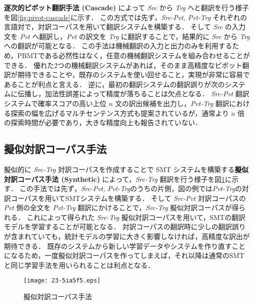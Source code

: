 \documentclass[japanese]{jnlp_1.4}
\begin{document}
\textbf{逐次的ピボット翻訳手法 (Cascade)} \cite{gispert06}によって \textit{Src} から \textit{Trg} へと翻訳を行う様子を図\ref{fig:pivot-cascade}に示す．
この方式では先ず，\textit{Src-Pvt, Pvt-Trg} それぞれの言語対で，対訳コーパスを用いて翻訳システムを構築する．
そして \textit{Src} の入力文を \textit{Pvt} へ翻訳し，\textit{Pvt} の訳文を \textit{Trg} に翻訳することで，結果的に \textit{Src} から \textit{Trg} への翻訳が可能となる．
この手法は機械翻訳の入力と出力のみを利用するため，PBMTである必然性はなく，任意の機械翻訳システムを組み合わせることができる．
優れた2つの機械翻訳システムがあれば，そのまま高精度なピボット翻訳が期待できることや，既存のシステムを使い回せること，実現が非常に容易であることが利点と言える．
逆に，最初の翻訳システムの翻訳誤りが次のシステムに伝播し，加法性誤差によって精度が落ちることは欠点となる．
\textit{Src-Pvt} 翻訳システムで確率スコアの高い上位 $n$ 文の訳出候補を出力し，\textit{Pvt-Trg} 翻訳における探索の幅を広げるマルチセンテンス方式も提案されている\cite{utiyama07}が，通常より $n$ 倍の探索時間が必要であり，大きな精度向上も報告されていない．


\subsection{擬似対訳コーパス手法}

擬似的に \textit{Src-Trg} 対訳コーパスを作成することで SMT システムを構築する\textbf{擬似対訳コーパス手法 (Synthetic)} \cite{gispert06}によって，\textit{Src-Trg} 翻訳を行う様子を図\ref{fig:pivot-corpus}に示す．
この手法では先ず，\textit{Src-Pvt, Pvt-Trg}のうちの片側，図の例では\textit{Pvt-Trg}の対訳コーパスを用いてSMTシステムを構築する．
そして \textit{Src-Pvt} 対訳コーパスの \textit{Pvt} 側の全文を \textit{Pvt-Trg} 翻訳にかけることで，\textit{Src-Trg} 擬似対訳コーパスが得られる．
これによって得られた \textit{Src-Trg} 擬似対訳コーパスを用いて，SMTの翻訳モデルを学習することが可能となる．
対訳コーパスの翻訳時に少しの翻訳誤りが含まれていても，統計モデルの学習に大きく影響しなければ，高精度な訳出が期待できる．
既存のシステムから新しい学習データやシステムを作り直すことになるため，一度擬似対訳コーパスを作ってしまえば，それ以降は通常のSMTと同じ学習手法を用いられることは利点となる．

\begin{figure}[b]
\begin{center}
\texttt{[image: 23-5ia5f5.eps]}
\end{center}
\caption{擬似対訳コーパス手法}
\label{fig:pivot-corpus}
\end{figure}
\end{document}
